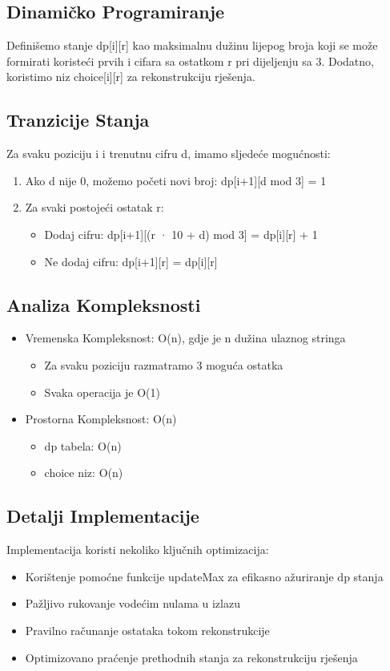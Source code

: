 \subsection{Dinamičko Programiranje}
Definišemo stanje dp[i][r] kao maksimalnu dužinu lijepog broja koji se može formirati koristeći prvih i cifara sa ostatkom r pri dijeljenju sa 3. Dodatno, koristimo niz choice[i][r] za rekonstrukciju rješenja.

\subsection{Tranzicije Stanja}
Za svaku poziciju i i trenutnu cifru d, imamo sljedeće mogućnosti:
\begin{enumerate}
    \item Ako d nije 0, možemo početi novi broj: dp[i+1][d mod 3] = 1
    \item Za svaki postojeći ostatak r:
        \begin{itemize}
            \item Dodaj cifru: dp[i+1][(r · 10 + d) mod 3] = dp[i][r] + 1
            \item Ne dodaj cifru: dp[i+1][r] = dp[i][r]
        \end{itemize}
\end{enumerate}

\subsection{Analiza Kompleksnosti}
\begin{itemize}
    \item Vremenska Kompleksnost: O(n), gdje je n dužina ulaznog stringa
        \begin{itemize}
            \item Za svaku poziciju razmatramo 3 moguća ostatka
            \item Svaka operacija je O(1)
        \end{itemize}
    \item Prostorna Kompleksnost: O(n)
        \begin{itemize}
            \item dp tabela: O(n)
            \item choice niz: O(n)
        \end{itemize}
\end{itemize}

\subsection{Detalji Implementacije}
Implementacija koristi nekoliko ključnih optimizacija:
\begin{itemize}
    \item Korištenje pomoćne funkcije updateMax za efikasno ažuriranje dp stanja
    \item Pažljivo rukovanje vodećim nulama u izlazu
    \item Pravilno računanje ostataka tokom rekonstrukcije
    \item Optimizovano praćenje prethodnih stanja za rekonstrukciju rješenja
\end{itemize}
 